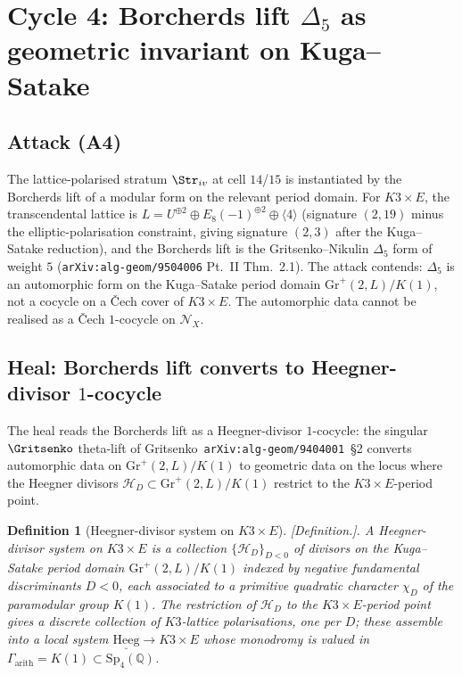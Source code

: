 \documentclass[11pt]{amsart}
\newtheorem{definition}[theorem]{Definition}
\providecommand{\Q}{\mathbb{Q}}
\providecommand{\cN}{\mathcal{N}}
\providecommand{\cH}{\mathcal{H}}
\providecommand{\Sp}{\mathrm{Sp}}
\providecommand{\ClaimStatusDefinition}{[\emph{Definition.}]}
\begin{document}
\section{Cycle 4: Borcherds lift $\Delta_5$ as geometric invariant on
Kuga--Satake}

\subsection*{Attack (A4)}

The lattice-polarised stratum $\Str_{iv}$ at cell $14$/$15$ is
instantiated by the Borcherds lift of a modular form on the relevant
period domain. For $K3 \times E$, the transcendental lattice is
$L = U^{\oplus 2} \oplus E_8(-1)^{\oplus 2} \oplus \langle 4 \rangle$
(signature $(2, 19)$ minus the elliptic-polarisation constraint,
giving signature $(2, 3)$ after the Kuga--Satake reduction), and the
Borcherds lift is the Gritsenko--Nikulin $\Delta_5$ form of weight
$5$ (\texttt{arXiv:alg-geom/9504006} Pt.~II Thm.~2.1). The attack
contends: $\Delta_5$ is an automorphic form on the Kuga--Satake
period domain $\mathrm{Gr}^+(2, L) / K(1)$, not a cocycle on a
\v{C}ech cover of $K3 \times E$. The automorphic data cannot be
realised as a \v{C}ech $1$-cocycle on $\cN_X$.

\subsection*{Heal: Borcherds lift converts to Heegner-divisor $1$-cocycle}

The heal reads the Borcherds lift as a Heegner-divisor $1$-cocycle:
the singular $\Gritsenko$ theta-lift of
Gritsenko~\texttt{arXiv:alg-geom/9404001}~\S 2 converts automorphic
data on $\mathrm{Gr}^+(2, L) / K(1)$ to geometric data on the locus
where the Heegner divisors $\cH_D \subset \mathrm{Gr}^+(2, L) / K(1)$
restrict to the $K3 \times E$-period point.

\begin{definition}[Heegner-divisor system on $K3 \times E$]
\label{def:R13-heegner-system}
\ClaimStatusDefinition.
A \emph{Heegner-divisor system} on $K3 \times E$ is a collection
$\{\cH_D\}_{D < 0}$ of divisors on the Kuga--Satake period domain
$\mathrm{Gr}^+(2, L) / K(1)$ indexed by negative fundamental
discriminants $D < 0$, each associated to a primitive quadratic
character $\chi_D$ of the paramodular group $K(1)$. The restriction
of $\cH_D$ to the $K3 \times E$-period point gives a discrete
collection of $K3$-lattice polarisations, one per $D$; these assemble
into a local system
$\underline{\mathrm{Heeg}} \to K3 \times E$ whose monodromy is valued
in $\Gamma_{\mathrm{arith}} = K(1) \subset \Sp_4(\Q)$.
\end{definition}
\end{document}
